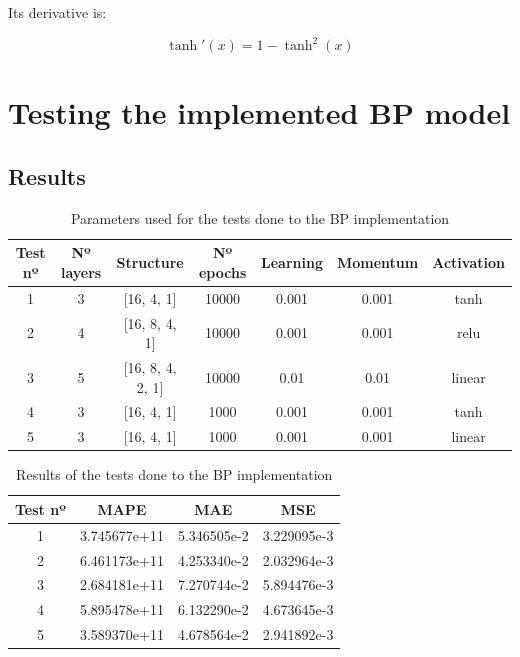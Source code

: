 \documentclass[11pt, a4paper]{article}
\begin{document}
Its derivative is:

$$ \tanh'(x) = 1 - \tanh^2(x) $$

\newpage

\section{Testing the implemented BP model}

\subsection{Results}

\begin{table}[H]
    \centering
    \begin{tabular}{|c|c|c|c|c|c|c|}
        \hline
        \textbf{Test nº} & \textbf{Nº layers} & \textbf{Structure}  & \textbf{Nº epochs} & \textbf{Learning} & \textbf{Momentum} & \textbf{Activation} \\ \hline
        1       & 3                & [16, 4, 1]       & 10000      & 0.001         & 0.001    & tanh                \\ \hline
        2       & 4                & [16, 8, 4, 1]    & 10000      & 0.001         & 0.001    & relu                \\ \hline
        3       & 5                & [16, 8, 4, 2, 1] & 10000      & 0.01          & 0.01     & linear              \\ \hline
        4       & 3                & [16, 4, 1]       & 1000       & 0.001         & 0.001    & tanh                \\ \hline
        5       & 3                & [16, 4, 1]       & 1000       & 0.001         & 0.001    & linear              \\ \hline
    \end{tabular}
    \caption{Parameters used for the tests done to the BP implementation}
    \label{tab:table_bp_parameters}
\end{table}

\begin{table}[H]
    \centering
    \begin{tabular}{|c|c|c|c|}
        \hline
        \textbf{Test nº} & \textbf{MAPE}         & \textbf{MAE}         & \textbf{MSE}         \\ \hline
        1       & 3.745677e+11 & 5.346505e-2 & 3.229095e-3 \\ \hline
        2       & 6.461173e+11 & 4.253340e-2 & 2.032964e-3 \\ \hline
        3       & 2.684181e+11 & 7.270744e-2 & 5.894476e-3 \\ \hline
        4       & 5.895478e+11 & 6.132290e-2 & 4.673645e-3 \\ \hline
        5       & 3.589370e+11 & 4.678564e-2 & 2.941892e-3 \\ \hline
    \end{tabular}
    \caption{Results of the tests done to the BP implementation}
    \label{tab:table_bp_results}
\end{table}
\end{document}
